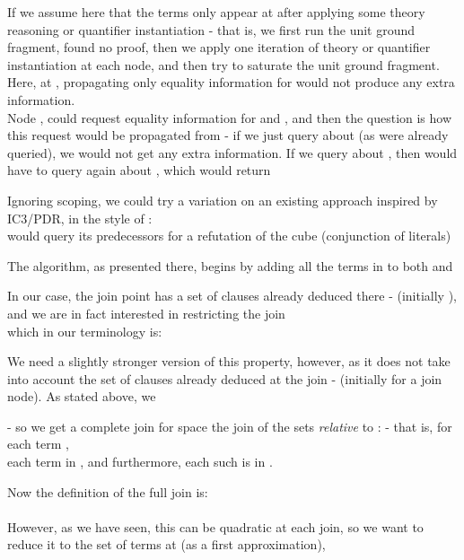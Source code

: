If we assume here that the terms  only appear at  after applying some theory reasoning or quantifier instantiation - that is, we first run the unit ground fragment, found no proof, then we apply one iteration of theory or quantifier instantiation at each node, and then try to saturate the unit ground fragment.
Here, at , propagating only equality information for  would not produce any extra information.\\
Node , could request equality information for  and , 
and then the question is how this request would be propagated from  - if we just query about  (as  were already queried), we would not get any extra information. If we query about , then  
would have to query again about , which would return 


Ignoring scoping, we could try a variation on an existing approach inspired by IC3/PDR, in the style of :\\
 would query its predecessors for a refutation of the cube (conjunction of literals) \\

The algorithm, as presented there, begins by adding all the terms in  to both  and 

In our case, the join point  has a set of clauses already deduced there -  (initially ), and we are in fact interested in restricting the join \\
 which in our terminology is:\\

We need a slightly stronger version of this property, however, as it does not take into account the set of clauses already deduced at the join -  (initially  for a join node).
As stated above, we 

 - so we get a complete join for 
space the join of the sets \emph{relative} to :  - that is, for each term , \\
each term in , and furthermore, each such  is in .

Now the definition of the full join is:\\
\\
However, as we have seen, this can be quadratic at each join, so we want to reduce it to the set of terms at  (as a first approximation), 
	
